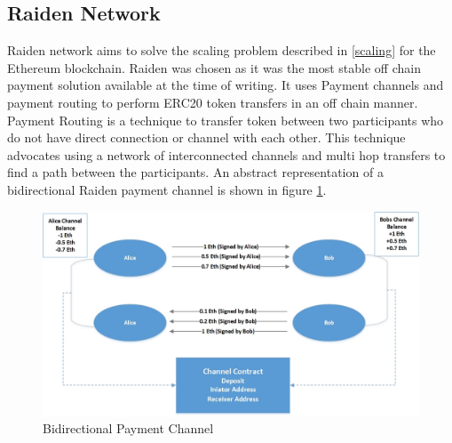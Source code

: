 \subsection{Raiden Network} \label{raiden} 
Raiden network aims to solve the scaling problem described in \ref{scaling} for the Ethereum blockchain. Raiden was chosen as it was the most stable off chain payment solution available at the time of writing. It uses Payment channels and payment routing to perform ERC20 token transfers in an off chain manner.  Payment Routing is a technique to transfer token between two participants who do not have direct connection or channel with each other. This technique advocates using a network of interconnected channels and multi hop transfers to find a path between the participants. An abstract representation of a bidirectional Raiden payment channel is shown in figure \ref{fig:RPC}. 

\begin{figure}[h]
	\centering
    \includegraphics[width=140mm,scale=1]{figs/RPC}
	\caption{Bidirectional Payment Channel}
	\label{fig:RPC}
\end{figure}

